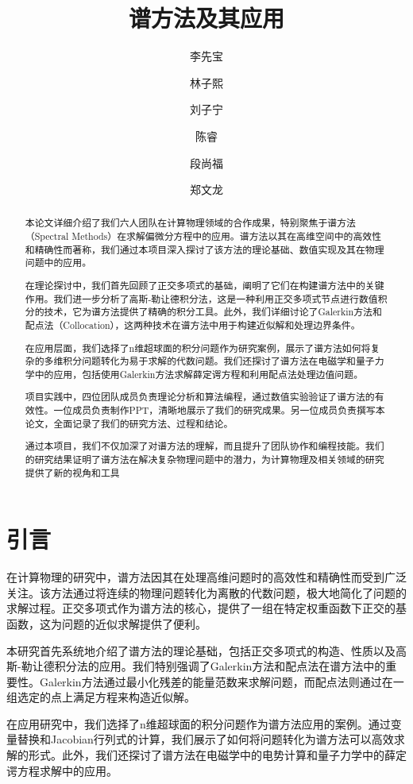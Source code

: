\documentclass[12pt]{ctexart}
\title{谱方法及其应用}
\author{李先宝 \and 林子熙 \and 刘子宁 \and 陈睿 \and 段尚福 \and 郑文龙}
\date{}
\numberwithin{equation}{section} %
\begin{document}
\maketitle
\begin{abstract}
    本论文详细介绍了我们六人团队在计算物理领域的合作成果，特别聚焦于谱方法（Spectral Methods）在求解偏微分方程中的应用。谱方法以其在高维空间中的高效性和精确性而著称，我们通过本项目深入探讨了该方法的理论基础、数值实现及其在物理问题中的应用。

在理论探讨中，我们首先回顾了正交多项式的基础，阐明了它们在构建谱方法中的关键作用。我们进一步分析了高斯-勒让德积分法，这是一种利用正交多项式节点进行数值积分的技术，它为谱方法提供了精确的积分工具。此外，我们详细讨论了Galerkin方法和配点法（Collocation），这两种技术在谱方法中用于构建近似解和处理边界条件。

在应用层面，我们选择了n维超球面的积分问题作为研究案例，展示了谱方法如何将复杂的多维积分问题转化为易于求解的代数问题。我们还探讨了谱方法在电磁学和量子力学中的应用，包括使用Galerkin方法求解薛定谔方程和利用配点法处理边值问题。

项目实践中，四位团队成员负责理论分析和算法编程，通过数值实验验证了谱方法的有效性。一位成员负责制作PPT，清晰地展示了我们的研究成果。另一位成员负责撰写本论文，全面记录了我们的研究方法、过程和结论。

通过本项目，我们不仅加深了对谱方法的理解，而且提升了团队协作和编程技能。我们的研究结果证明了谱方法在解决复杂物理问题中的潜力，为计算物理及相关领域的研究提供了新的视角和工具
\end{abstract}
\newpage
\tableofcontents
\newpage
\section{引言}
在计算物理的研究中，谱方法因其在处理高维问题时的高效性和精确性而受到广泛关注。该方法通过将连续的物理问题转化为离散的代数问题，极大地简化了问题的求解过程。正交多项式作为谱方法的核心，提供了一组在特定权重函数下正交的基函数，这为问题的近似求解提供了便利。

本研究首先系统地介绍了谱方法的理论基础，包括正交多项式的构造、性质以及高斯-勒让德积分法的应用。我们特别强调了Galerkin方法和配点法在谱方法中的重要性。Galerkin方法通过最小化残差的能量范数来求解问题，而配点法则通过在一组选定的点上满足方程来构造近似解。

在应用研究中，我们选择了n维超球面的积分问题作为谱方法应用的案例。通过变量替换和Jacobian行列式的计算，我们展示了如何将问题转化为谱方法可以高效求解的形式。此外，我们还探讨了谱方法在电磁学中的电势计算和量子力学中的薛定谔方程求解中的应用。
\end{document}
